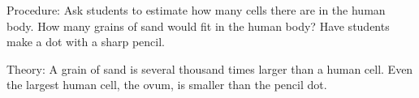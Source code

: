 \begin{multicols}{2}

\begin{description*}
\item[Procedure:]{Ask students to estimate how many cells there are in the human body. How many grains of sand would fit in the human body? Have students make a dot with a sharp pencil.}
\item[Theory:]{A grain of sand is several thousand times larger than a human cell. Even the largest human cell, the ovum, is smaller than the pencil dot.}
\end{description*}



\end{multicols}

\pagebreak
